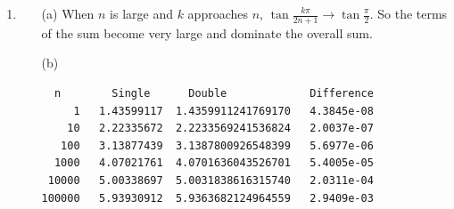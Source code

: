 \documentclass[11pt]{article}
\begin{document}
\begin{enumerate}
    \item %
        \begin{enumerate}
            \item[(a)]
                When $n$ is large and $k$ approaches $n$,
                $\tan{\frac{k\pi}{2n + 1}} \to \tan{\frac{\pi}{2}}$.
                So the terms of the sum become very large and dominate the overall
                sum.

            \item[(b)]
                \begin{verbatim}
  n        Single      Double             Difference
     1   1.43599117  1.4359911241769170   4.3845e-08
    10   2.22335672  2.2233569241536824   2.0037e-07
   100   3.13877439  3.1387800926548399   5.6977e-06
  1000   4.07021761  4.0701636043526701   5.4005e-05
 10000   5.00338697  5.0031838616315740   2.0311e-04
100000   5.93930912  5.9363682124964559   2.9409e-03
                \end{verbatim}
                
                
        \end{enumerate}


\end{enumerate}
\end{document}
